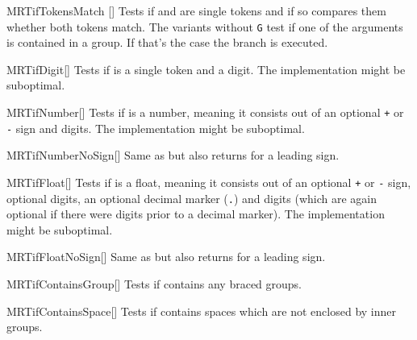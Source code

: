 \begin{describemacroTF}{MRTifTokensMatch}%
  []
  Tests if  and  are single tokens and if so compares
  them whether both tokens match. The variants without \texttt{G} test if one of
  the arguments is contained in a group. If that's the case the 
  branch is executed.
\end{describemacroTF}

\begin{describemacroTF}[G,N,GN]{MRTifDigit}[]
  Tests if  is a single token and a digit. The implementation might be
  suboptimal.
\end{describemacroTF}

\begin{describemacroTF}[G,N,GN]{MRTifNumber}[]
  Tests if  is a number, meaning it consists out of an optional
  \texttt{+} or \texttt{-} sign and digits. The implementation might be
  suboptimal.
\end{describemacroTF}

\begin{describemacroTF}[G,N,GN]{MRTifNumberNoSign}[]
  Same as  but also returns  for a leading sign.
\end{describemacroTF}

\begin{describemacroTF}[G,N,GN]{MRTifFloat}[]
  Tests if  is a float, meaning it consists out of an optional
  \texttt{+} or \texttt{-} sign, optional digits, an optional decimal marker
  (\texttt{.}) and digits (which are again optional if there were digits prior
  to a decimal marker). The implementation might be suboptimal.
\end{describemacroTF}

\begin{describemacroTF}[G,N,GN]{MRTifFloatNoSign}[]
  Same as  but also returns  for a leading sign.
\end{describemacroTF}

\begin{describemacroTF}[G,N,GN]{MRTifContainsGroup}[]
  Tests if  contains any braced groups.
\end{describemacroTF}

\begin{describemacroTF}[G,N,GN]{MRTifContainsSpace}[]
  Tests if  contains spaces which are not enclosed by inner groups.
\end{describemacroTF}

